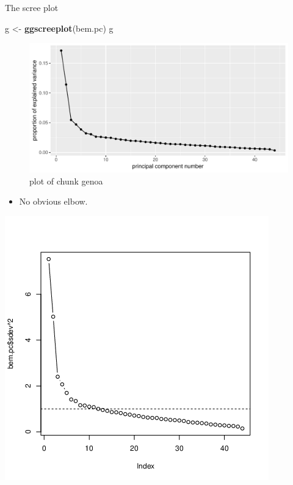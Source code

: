 \documentclass[ignorenonframetext,]{beamer}
\newenvironment{Shaded}{\begin{snugshade}}{\end{snugshade}}
\newcommand{\KeywordTok}[1]{\textcolor[rgb]{0.13,0.29,0.53}{\textbf{#1}}}
\newcommand{\NormalTok}[1]{#1}
\newcommand{\StringTok}[1]{\textcolor[rgb]{0.31,0.60,0.02}{#1}}
\providecommand{\tightlist}{%
  \setlength{\itemsep}{0pt}\setlength{\parskip}{0pt}}
\begin{document}
\begin{frame}[fragile]{The scree plot}
\protect\hypertarget{the-scree-plot}{}

\begin{Shaded}
\begin{Highlighting}[]
\NormalTok{g <-}\StringTok{ }\KeywordTok{ggscreeplot}\NormalTok{(bem.pc)}
\NormalTok{g}
\end{Highlighting}
\end{Shaded}

\begin{figure}
\centering
\includegraphics{figure/genoa-1.pdf}
\caption{plot of chunk genoa}
\end{figure}

\begin{itemize}
\tightlist
\item
  No obvious elbow.
\end{itemize}

\includegraphics{bFactor-bem-scree.png}

\end{frame}
\end{document}
